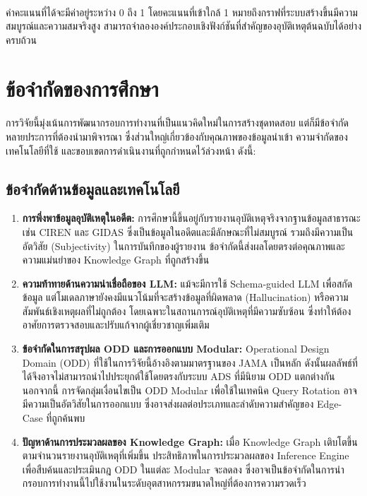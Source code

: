 \paragraph{}
ค่าคะแนนที่ได้จะมีค่าอยู่ระหว่าง 0 ถึง 1 โดยคะแนนที่เข้าใกล้ 1 หมายถึงกราฟที่ระบบสร้างขึ้นมีความสมบูรณ์และความสมจริงสูง สามารถจำลององค์ประกอบเชิงฟังก์ชันที่สำคัญของอุบัติเหตุต้นฉบับได้อย่างครบถ้วน

\section{ข้อจำกัดของการศึกษา}\label{sec:ch4_limitations}
\paragraph{}

การวิจัยนี้มุ่งเน้นการพัฒนากรอบการทำงานที่เป็นแนวคิดใหม่ในการสร้างชุดทดสอบ แต่ก็มีข้อจำกัดหลายประการที่ต้องนำมาพิจารณา ซึ่งส่วนใหญ่เกี่ยวข้องกับคุณภาพของข้อมูลนำเข้า ความจำกัดของเทคโนโลยีที่ใช้ และขอบเขตการดำเนินงานที่ถูกกำหนดไว้ล่วงหน้า ดังนี้:

\subsection{ข้อจำกัดด้านข้อมูลและเทคโนโลยี}

\begin{enumerate}
    \item \textbf{การพึ่งพาข้อมูลอุบัติเหตุในอดีต:} การศึกษานี้ขึ้นอยู่กับรายงานอุบัติเหตุจริงจากฐานข้อมูลสาธารณะ เช่น CIREN และ GIDAS ซึ่งเป็นข้อมูลในอดีตและมีลักษณะที่ไม่สมบูรณ์ รวมถึงมีความเป็นอัตวิสัย (Subjectivity) ในการบันทึกของผู้รายงาน ข้อจำกัดนี้ส่งผลโดยตรงต่อคุณภาพและความแม่นยำของ Knowledge Graph ที่ถูกสร้างขึ้น
    \item \textbf{ความท้าทายด้านความน่าเชื่อถือของ LLM:} แม้จะมีการใช้ Schema-guided LLM เพื่อสกัดข้อมูล แต่โมเดลภาษายังคงมีแนวโน้มที่จะสร้างข้อมูลที่ผิดพลาด (Hallucination) หรือความสัมพันธ์เชิงเหตุผลที่ไม่ถูกต้อง โดยเฉพาะในสถานการณ์อุบัติเหตุที่มีความซับซ้อน ซึ่งทำให้ต้องอาศัยการตรวจสอบและปรับแก้จากผู้เชี่ยวชาญเพิ่มเติม
    \item \textbf{ข้อจำกัดในการสรุปผล ODD และการออกแบบ Modular:} Operational Design Domain (ODD) ที่ใช้ในการวิจัยนี้อ้างอิงตามมาตรฐานของ JAMA เป็นหลัก ดังนั้นผลลัพธ์ที่ได้จึงอาจไม่สามารถนำไปประยุกต์ใช้โดยตรงกับระบบ ADS ที่มีนิยาม ODD แตกต่างกัน นอกจากนี้ การจัดกลุ่มเงื่อนไขเป็น ODD Modular เพื่อใช้ในเทคนิค Query Rotation อาจมีความเป็นอัตวิสัยในการออกแบบ ซึ่งอาจส่งผลต่อประเภทและลำดับความสำคัญของ Edge-Case ที่ถูกค้นพบ
    \item \textbf{ปัญหาด้านการประมวลผลของ Knowledge Graph:} เมื่อ Knowledge Graph เติบโตขึ้นตามจำนวนรายงานอุบัติเหตุที่เพิ่มขึ้น ประสิทธิภาพในการประมวลผลของ Inference Engine เพื่อสืบค้นและประเมินกฎ ODD ในแต่ละ Modular จะลดลง ซึ่งอาจเป็นข้อจำกัดในการนำกรอบการทำงานนี้ไปใช้งานในระดับอุตสาหกรรมขนาดใหญ่ที่ต้องการความรวดเร็ว
\end{enumerate}

